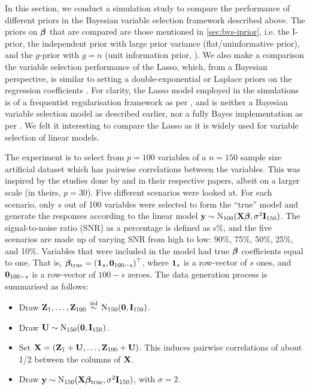 \documentclass[showframe,11pt,twoside,openright]{report}
\begin{document}
In this section, we conduct a simulation study to compare the performance of different priors in the Bayesian variable selection framework described above.
The priors on ${\bm\beta}$ that are compared are those mentioned in \cref{sec:bvs-iprior}, i.e. the I-prior, the independent prior with large prior variance (flat/uninformative prior), and the $g$-prior with $g=n$ (unit information prior, \cite{Ntzoufras2008}).
We also make a comparison the variable selection performance of the Lasso, which, from a Bayesian perspective, is similar to setting a double-exponential or Laplace priors on the regression coefficients \citep{park2008bayesian}. 
For clarity, the Lasso model employed in the simulations is of a frequentist regularisation framework as per \citet{tibshirani1996regression}, and is neither a Bayesian variable selection model as described earlier, nor a fully Bayes implementation as per \citet{park2008bayesian}.
We felt it interesting to compare the Lasso as it is widely used for variable selection of linear models.

The experiment is to select from $p=100$ variables of a $n=150$ sample size artificial dataset which has pairwise correlations between the variables. This was inspired by the studies done by \citet{George1993} and \citet{Kuo1998} in their respective papers, albeit on a larger scale (in theirs, $p=30$).
Five different scenarios were looked at. 
For each scenario, only $s$ out of 100 variables were selected to form the ``true'' model and generate the responses according to the linear model ${\mathbf y}\sim\operatorname{N}_{100}({\mathbf X}{\bm\beta},\sigma^2 {\mathbf I}_{150})$. 
The signal-to-noise ratio (SNR) as a percentage is defined as s\%, and the five scenarios are made up of varying SNR from high to low: 90\%, 75\%, 50\%, 25\%, and 10\%.
Variables that were included in the model had true ${\bm\beta}$ coefficients equal to one.
That is, ${\bm\beta}_\text{true}=({\mathbf 1}_{s},{\mathbf 0}_{100-s})^\top$, where ${\mathbf 1}_{s}$ is a row-vector of $s$ ones, and ${\mathbf 0}_{100-s}$ is a row-vector of $100-s$ zeroes.
The data generation process is summarised as follows:
\begin{itemize}
	\item Draw ${\mathbf Z}_1, \dots, {\mathbf Z}_{100} \,\overset{\text{iid}}{\sim}\, \operatorname{N}_{150}({\mathbf 0}, {\mathbf I}_{150})$.
	\item Draw ${\mathbf U} \sim \operatorname{N}_{150}({\mathbf 0}, {\mathbf I}_{150})$.
	\item Set ${\mathbf X} = ({\mathbf Z}_1 + {\mathbf U},\dots,{\mathbf Z}_{100}+{\mathbf U})$. This induces pairwise correlations of about 1/2 between the columns of ${\mathbf X}$.\footnotemark~
	\item Draw ${\mathbf y} \sim \operatorname{N}_{150}({\mathbf X} {\bm\beta}_{\text{true}}, \sigma^2\mathbf I_{150})$, with $\sigma=2$.
\end{itemize}
\end{document}
